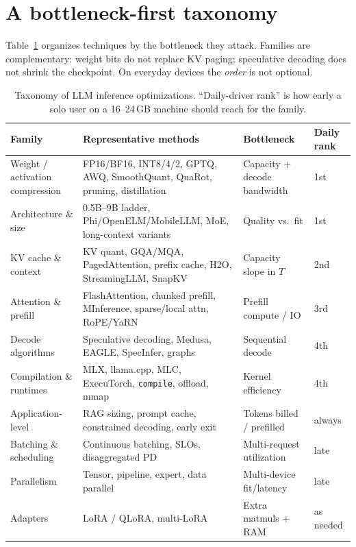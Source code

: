 \section{A bottleneck-first taxonomy}
\label{sec:taxonomy}

Table~\ref{tab:taxonomy} organizes techniques by the bottleneck they attack. Families are complementary: weight bits do not replace KV paging; speculative decoding does not shrink the checkpoint. On everyday devices the \emph{order} is not optional.

\begin{table}[t]
  \centering
  \small
  \caption{Taxonomy of LLM inference optimizations. ``Daily-driver rank'' is how early a solo user on a 16--24\,GB machine should reach for the family.}
  \label{tab:taxonomy}
  \begin{tabularx}{\textwidth}{@{}>{\raggedright\arraybackslash}p{2.2cm}X>{\raggedright\arraybackslash}p{2.4cm}>{\raggedright\arraybackslash}p{1.6cm}@{}}
    \toprule
    Family & Representative methods & Bottleneck & Daily rank \\
    \midrule
    Weight / activation compression & FP16/BF16, INT8/4/2, GPTQ, AWQ, SmoothQuant, QuaRot, pruning, distillation & Capacity + decode bandwidth & 1st \\
    Architecture \& size & 0.5B--9B ladder, Phi/OpenELM/MobileLLM, MoE, long-context variants & Quality vs.\ fit & 1st \\
    KV cache \& context & KV quant, GQA/MQA, PagedAttention, prefix cache, H2O, StreamingLLM, SnapKV & Capacity slope in \(T\) & 2nd \\
    Attention \& prefill & FlashAttention, chunked prefill, MInference, sparse/local attn, RoPE/YaRN & Prefill compute / IO & 3rd \\
    Decode algorithms & Speculative decoding, Medusa, EAGLE, SpecInfer, graphs & Sequential decode & 4th \\
    Compilation \& runtimes & MLX, llama.cpp, MLC, ExecuTorch, \texttt{compile}, offload, mmap & Kernel efficiency & 4th \\
    Application-level & RAG sizing, prompt cache, constrained decoding, early exit & Tokens billed / prefilled & always \\
    Batching \& scheduling & Continuous batching, SLOs, disaggregated PD & Multi-request utilization & late \\
    Parallelism & Tensor, pipeline, expert, data parallel & Multi-device fit/latency & late \\
    Adapters & LoRA / QLoRA, multi-LoRA & Extra matmuls + RAM & as needed \\
    \bottomrule
  \end{tabularx}
\end{table}

